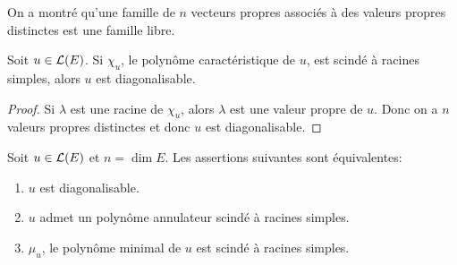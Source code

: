 On a montré qu'une famille de $n$ vecteurs propres associés à des valeurs propres distinctes est une famille libre.

\begin{coro}
	Soit $u \in \mathcal{L}(E)$. Si $\chi_u$, le polynôme caractéristique de $u$, est scindé à racines simples, alors $u$ est diagonalisable.
\end{coro}

\begin{proof}
	Si $\lambda$ est une racine de $\chi_u$, alors $\lambda$ est une valeur propre de $u$. Donc on a $n$ valeurs propres distinctes et donc $u$ est diagonalisable.
\end{proof}

\begin{theorem}
	Soit $u \in \mathcal{L}(E)$ et $n = \dim E$. Les assertions suivantes sont équivalentes:
	\begin{enumerate}
		\item $u$ est diagonalisable.
		\item $u$ admet un polynôme annulateur scindé à racines simples.
		\item $\mu_u$, le polynôme minimal de $u$ est scindé à racines simples.
	\end{enumerate}
\end{theorem}

